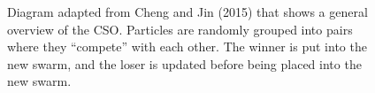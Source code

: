 \documentclass[12pt]{article}
\theoremstyle{definition}
\begin{document}
\begin{figure}[H]
    \centering
    \caption{Diagram adapted from Cheng and Jin (2015) that shows a general overview of the CSO. Particles are randomly grouped into pairs where they ``compete'' with each other. The winner is put into the new swarm, and the loser is updated before being placed into the new swarm.}
    \label{fig:cso}
\end{figure}
\end{document}
